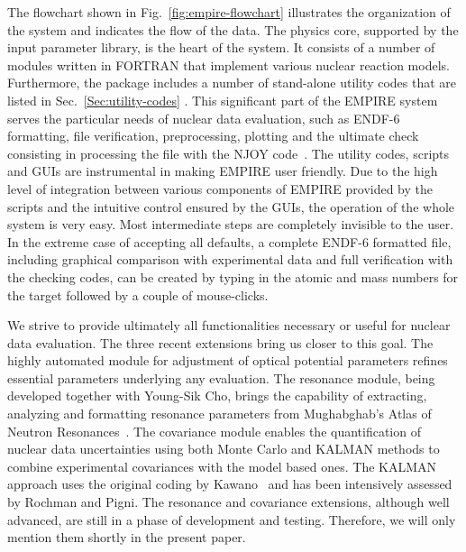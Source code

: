 The flowchart shown in Fig.~\ref{fig:empire-flowchart} illustrates the
organization of the system and indicates the flow of the data. The physics core,
supported by the input parameter library, is the heart of the system. It
consists of a number of modules written in FORTRAN that implement various
nuclear reaction models. Furthermore, the package includes a number
of stand-alone utility codes that are listed in Sec.~\ref{Sec:utility-codes}%
. This significant part of the EMPIRE system serves the particular needs of
nuclear data evaluation, such as ENDF-6 formatting, file verification,
preprocessing, plotting and the ultimate check consisting in processing the
file with the NJOY code~\cite{MacFarlane:06,MacFarlane:94}. The utility
codes, scripts and GUIs are instrumental in making EMPIRE user friendly. Due
to the high level of integration between various components of EMPIRE
provided by the scripts and the intuitive control ensured by the GUIs, the
operation of the whole system is very easy. Most intermediate steps are
completely invisible to the user. In the extreme case of accepting all
defaults, a complete ENDF-6 formatted file, including graphical comparison
with experimental data and full verification with the checking codes, can be
created by typing in the atomic and mass numbers for the target followed by
a couple of mouse-clicks.

We strive to provide ultimately all functionalities necessary or useful for
nuclear data evaluation. The three recent extensions bring us closer to this
goal. The highly automated module for adjustment of optical potential
parameters refines essential parameters underlying any evaluation. The
resonance module, being developed together with Young-Sik Cho, brings the
capability of extracting, analyzing and formatting resonance parameters from
Mughabghab's Atlas of Neutron Resonances~\cite{Mughabghab:06}. The
covariance module enables the quantification of nuclear data uncertainties using
both Monte Carlo and KALMAN methods to combine experimental covariances with
the model based ones. The KALMAN approach uses the original coding by Kawano~%
\cite{Kawano:97} and has been intensively assessed by Rochman and Pigni. The
resonance and covariance extensions, although well advanced, are still in a
phase of development and testing. Therefore, we will only mention them
shortly in the present paper.

